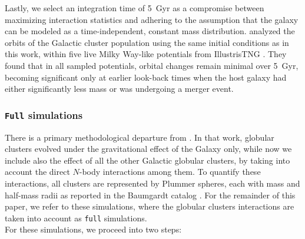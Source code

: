 \documentclass[draft]{aa}
\begin{document}
    Lastly, we select an integration time of 5~Gyr as a compromise between maximizing interaction statistics and adhering to the assumption that the galaxy can be modeled as a time-independent, constant mass distribution. \citet{2023A&A...673A.152I} analyzed the orbits of the Galactic cluster population using the same initial conditions as in this work, within five live Milky Way-like potentials from IllustrisTNG \citep{2018MNRAS.473.4077P}. They found that in all sampled potentials, orbital changes remain minimal over 5~Gyr, becoming significant only at earlier look-back times when the host galaxy had either significantly less mass or was undergoing a merger event.




    \subsubsection*{ \texttt{Full} simulations}
    There is a primary methodological departure from \citet{2023A&A...673A..44F}.  In that work, globular clusters evolved under the gravitational effect of the Galaxy only, while now we include also the effect of all the other Galactic globular clusters, by taking into account the direct $N$-body interactions among them. To quantify these interactions, all clusters are represented by Plummer spheres, each with mass and half-mass radii as reported in the Baumgardt catalog \citep{2021MNRAS.505.5957B}. For the remainder of this paper, we refer to these simulations, where the globular clusters interactions are taken into account as \texttt{full} simulations. \\
    For these simulations, we proceed into two steps:
\end{document}
